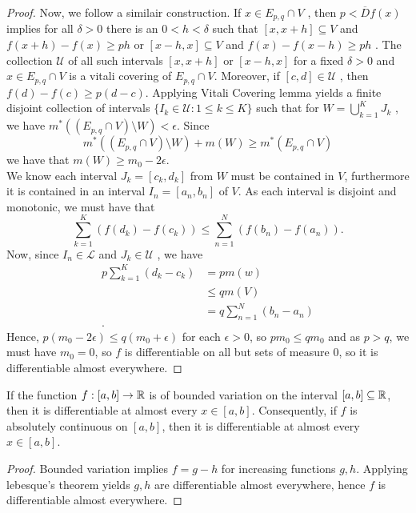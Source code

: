 \begin{proof}
	Now, we follow a similair construction. If \(x \in E_{p, q}\cap V\) , then \(p < \overline{D}f\left( x \right) \) implies for all \(\delta > 0\) there is an \( 0 < h < \delta\) such that \(\left[ x, x + h \right] \subseteq V\) and \(f\left( x + h \right) - f\left( x \right) \ge ph\) or \(\left[ x-h ,x \right] \subseteq V\) and \(f\left( x \right) - f\left( x-h \right) \ge ph\) . The collection \(\mathscr{U}\) of all such intervals \(\left[ x, x+h \right] \) or \(\left[ x-h, x \right] \) for a fixed \(\delta >0\) and \(x \in E_{p, q}\cap V\) is a vitali covering of \(E_{p, q}\cap V\). Moreover, if \(\left[ c, d \right] \in \mathscr{U}\) , then \(f\left( d \right) -f\left( c \right)  \ge p\left( d-c \right) \). Applying Vitali Covering lemma yields a finite disjoint collection of intervals \(\{I_{k} \in \mathscr{U} : 1\le k \le K\} \) such that for \(W = \bigcup_{k=1} ^{K}J_{k}\) , we have \(m^{*}\left( \left( E_{p, q}\cap V \right) \setminus W \right) < \epsilon\). Since \[
		m^{*}\left( \left( E_{p, q}\cap V \right)\setminus W  \right) + m\left( W \right)  \ge m^{*}\left( E_{p, q}\cap V \right)
	\] we have that \(m\left( W \right) \ge m_0 - 2\epsilon \).\\
	We know each interval \(J_{k} = \left[ c_{k} ,d_{k} \right] \) from \(W\)  must be contained in \(V\), furthermore it is contained in an interval \(I_{n} = \left[ a_{n}, b_{n} \right] \) of \(V\). As each interval is disjoint and monotonic, we must have that \[
		\sum_{k=1}^{K} \left( f\left( d_{k} \right) - f\left( c_{k} \right)   \right)  \le \sum_{n=1}^{N} \left( f\left( b_{n} \right)- f\left( a_{n} \right)   \right)
	.\]
	Now, since \(I_{n} \in \mathscr{L}\) and \(J_{k} \in \mathscr{U}\) , we have
	\begin{align*}
		p \sum_{k=1}^{K} \left( d_{k} - c_{k} \right)  &=  pm\left( w \right)  \\
							       &\le qm\left( V \right) \\
							       &= q \sum_{n=1}^{N} \left( b_{n} - a_{n} \right)  \\
	.\end{align*}
	Hence, \(p\left( m_0 - 2\epsilon \right) \le q\left( m_0 + \epsilon \right) \) for each \(\epsilon > 0\), so \(pm_0 \le qm_0\) and as \(p > q\), we must have \(m_0 = 0\), so \(f\) is differentiable on all but sets of measure \(0\), so it is differentiable almost everywhere.
\end{proof}
\begin{corollary}
	If the function \(f: \left[ a, b \right]  \to \mathbb{R}\) is of bounded variation on the interval \(\left[ a, b \right] \subseteq \mathbb{R}\), then it is differentiable at almost every \(x \in \left[ a, b \right] \). Consequently, if \(f\) is absolutely continuous on \(\left[ a, b \right] \), then it is differentiable at almost every \(x \in \left[ a, b \right] \).
\end{corollary}
\begin{proof}
	Bounded variation implies \(f = g-h\) for increasing functions \(g, h\). Applying lebesque's theorem yields \(g, h\) are differentiable almost everywhere, hence \(f\) is differentiable almost everywhere.
\end{proof}
